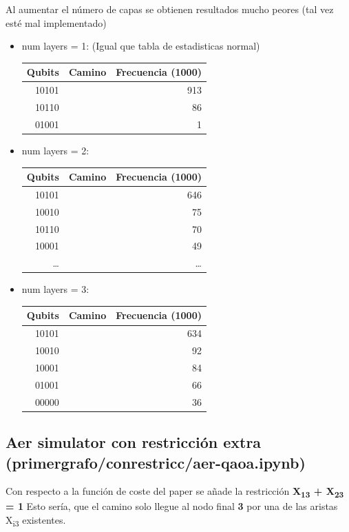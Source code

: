 \documentclass[letterpaper]{article}
\begin{document}
Al aumentar el número de capas se obtienen resultados mucho peores (tal vez esté mal implementado)
\begin{itemize}
\item num layers = 1: (Igual que tabla de estadisticas normal)
\begin{center}
\begin{tabular}{|r|l|r|}
\hline
\textbf{Qubits} & \textbf{Camino} & \textbf{Frecuencia (1000)}\\
\hline
10101 &  & 913\\
10110 &  & 86\\
01001 &  & 1\\
\hline
\end{tabular}
\end{center}

\item num layers = 2:
\begin{center}
\begin{tabular}{|r|l|r|}
\hline
\textbf{Qubits} & \textbf{Camino} & \textbf{Frecuencia (1000)}\\
\hline
10101 &  & 646\\
10010 &  & 75\\
10110 &  & 70\\
10001 &  & 49\\
\ldots{} &  & \ldots{}\\
\hline
\end{tabular}
\end{center}

\item num layers = 3:
\begin{center}
\begin{tabular}{|r|l|r|}
\hline
\textbf{Qubits} & \textbf{Camino} & \textbf{Frecuencia (1000)}\\
\hline
10101 &  & 634\\
10010 &  & 92\\
10001 &  & 84\\
01001 &  & 66\\
00000 &  & 36\\
\hline
\end{tabular}
\end{center}
\end{itemize}

\subsection{Aer simulator con restricción extra  (primer\textunderscore grafo/con\textunderscore restricc/aer-qaoa.ipynb)}
\label{sec:org0247eae}
Con respecto a la función de coste del paper se añade la restricción\newline
    \textbf{X\textsubscript{13} + X\textsubscript{23} = 1}\newline
Esto sería, que el camino solo llegue al nodo final \textbf{3} por una de las aristas X\textsubscript{i3} existentes.
\end{document}
